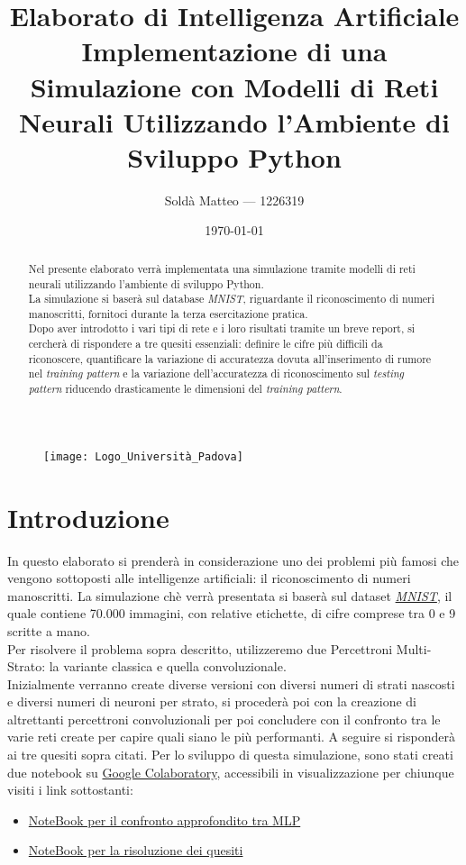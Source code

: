 \documentclass[12pt, a4paper]{article}
\title{\textbf{Elaborato di Intelligenza Artificiale} \\ Implementazione di una Simulazione con Modelli di Reti Neurali Utilizzando l'Ambiente di Sviluppo Python}
\author{Soldà Matteo --- 1226319}
\date{\today}
\begin{document}
\begin{figure}
    \centering
    \texttt{[image: Logo\_Università\_Padova]}
\end{figure}

\maketitle

\newpage
\begin{abstract}
Nel presente elaborato verrà implementata una simulazione tramite modelli di reti neurali utilizzando l'ambiente di sviluppo Python.\\
La simulazione si baserà sul database \textit{MNIST}, riguardante il riconoscimento di numeri manoscritti, fornitoci durante la terza esercitazione pratica.\\
Dopo aver introdotto i vari tipi di rete e i loro risultati tramite un breve report, si cercherà di rispondere a tre quesiti essenziali: definire le cifre più difficili da riconoscere, quantificare la variazione di accuratezza dovuta all'inserimento di rumore nel \textit{training pattern} e la variazione dell'accuratezza di riconoscimento sul \textit{testing pattern} riducendo drasticamente le dimensioni del \textit{training pattern}.    
\end{abstract}

\newpage
\tableofcontents

\newpage
\section{Introduzione}
In questo elaborato si prenderà in considerazione uno dei problemi più famosi che vengono sottoposti alle intelligenze artificiali: il riconoscimento di numeri manoscritti.
La simulazione chè verrà presentata si baserà sul dataset \href{http://yann.lecun.com/exdb/mnist/}{\textit{MNIST}}, il quale contiene 70.000 immagini, con relative etichette, di cifre comprese tra 0 e 9 scritte a mano.\\
Per risolvere il problema sopra descritto, utilizzeremo due Percettroni Multi-Strato: la variante classica e quella convoluzionale.\\
Inizialmente verranno create diverse versioni con diversi numeri di strati nascosti e diversi numeri di neuroni per strato, si procederà poi con la creazione di altrettanti percettroni convoluzionali per poi concludere con il confronto tra le varie reti create per capire quali siano le più performanti. A seguire si risponderà ai tre quesiti sopra citati.
Per lo sviluppo di questa simulazione, sono stati creati due notebook su \href{https://colab.research.google.com/?utm_source=scs-index}{Google Colaboratory}, accessibili in visualizzazione per chiunque visiti i link sottostanti:
\begin{itemize}
    \item \href{https://colab.research.google.com/drive/1e4vY_9wn6-ugL5NivZc0RBluGdfWqTUM?usp=sharing}{NoteBook per il confronto approfondito tra MLP}
    \item \href{https://colab.research.google.com/drive/1v2dkWKelr-q5CTpsDUDqp55PUqiId64F?usp=sharing}{NoteBook per la risoluzione dei quesiti}
\end{itemize}
\end{document}
